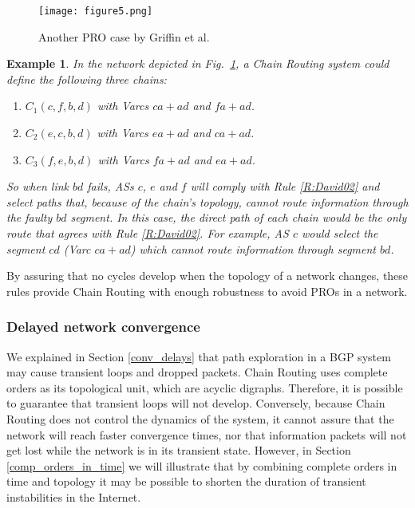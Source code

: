 \documentclass[5p,twocolumn]{elsarticle}
\newtheorem{example}{Example}
\begin{document}
\begin{figure}[!t]
	\centering
		\texttt{[image: figure5.png]}
	\caption{Another PRO case by Griffin et al.}
	\label{fig:72_Griffin}
\end{figure}

\begin{example}
In the network depicted in Fig.\ \ref{fig:72_Griffin}, a Chain Routing system could define the following three chains:

\begin{enumerate}
	\item $C_1\left(c, f, b, d\right)$ with Varcs $ca+ad$ and $fa+ad$.
	\item $C_2\left(e, c, b, d\right)$ with Varcs $ea+ad$ and $ca+ad$.
	\item $C_3\left(f, e, b, d\right)$ with Varcs $fa+ad$ and $ea+ad$.
\end{enumerate}

So when link $bd$ fails, ASs $c$, $e$ and $f$ will comply with Rule \ref{R:David02} and select paths that, because of the chain's topology, cannot route information through the faulty $bd$ segment. In this case, the direct path of each chain would be the only route that agrees with Rule \ref{R:David02}. For example, AS $c$ would select the segment $cd$ (Varc $ca+ad$) which cannot route information through segment $bd$.
\end{example}

By assuring that no cycles develop when the topology of a network changes, these rules provide Chain Routing with enough robustness to avoid PROs in a network.


\subsubsection{Delayed network convergence}

We explained in Section \ref{conv_delays} that path exploration in a BGP system may cause transient loops and dropped packets. Chain Routing uses complete orders as its topological unit, which are acyclic digraphs. Therefore, it is possible to guarantee that transient loops will not develop. Conversely, because Chain Routing does not control the dynamics of the system, it cannot assure that the network will reach faster convergence times, nor that information packets will not get lost while the network is in its transient state. However, in Section \ref{comp_orders_in_time} we will illustrate that by combining complete orders in time and topology it may be possible to shorten the duration of transient instabilities in the Internet.
\end{document}
